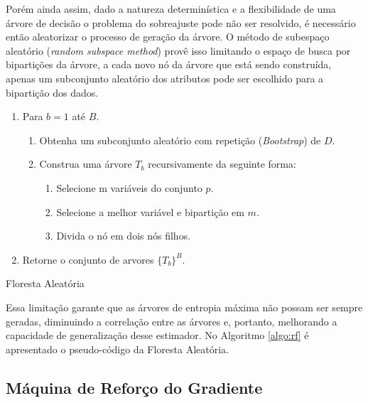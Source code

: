 Porém ainda assim, dado a natureza determinística e a flexibilidade de uma
árvore de decisão o problema do sobreajuste pode não ser resolvido, é
necessário então aleatorizar o processo de geração da árvore. O método de
subespaço aleatório (\textit{random subspace method}) provê isso limitando o
espaço de busca por bipartições da árvore, a cada novo nó da árvore que está
sendo construída, apenas um subconjunto aleatório dos atributos pode ser
escolhido para a bipartição dos dados.

\begin{algorithm}[H]
\begin{enumerate}
    \item Para $b=1$ até $B$.
    \begin{enumerate}
        \item Obtenha um subconjunto aleatório com repetição
            (\textit{Bootstrap}) de $D$.
        \item Construa uma árvore $T_b$ recursivamente da seguinte forma:
        \begin{enumerate}
            \item Selecione m variáveis do conjunto $p$.
            \item Selecione a melhor variável e bipartição em $m$.
            \item Divida o nó em dois nós filhos.
        \end{enumerate}
    \end{enumerate}
    \item Retorne o conjunto de arvores $\{T_b\}^B$.
\end{enumerate}
 \caption{Floresta Aleatória}
 \label{algo:rf}
\end{algorithm}

Essa limitação garante que as árvores de entropia máxima não possam ser sempre
geradas, diminuindo a correlação entre as árvores e, portanto, melhorando a
capacidade de generalização desse estimador. No Algoritmo \ref{algo:rf} é
apresentado o pseudo-código da Floresta Aleatória.

\subsection{Máquina de Reforço do Gradiente}


